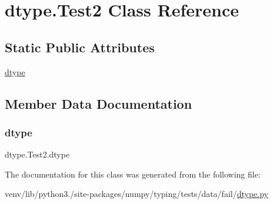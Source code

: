 \hypertarget{classdtype_1_1Test2}{}\section{dtype.\+Test2 Class Reference}
\label{classdtype_1_1Test2}
\subsection*{Static Public Attributes}
\begin{DoxyCompactItemize}
\item 
\hyperlink{classdtype_1_1Test2_a15b6b41108efdc55a68507e2f3ac42a2}{dtype}
\end{DoxyCompactItemize}


\subsection{Member Data Documentation}
\mbox{\label{classdtype_1_1Test2_a15b6b41108efdc55a68507e2f3ac42a2}} 
\subsubsection{\texorpdfstring{dtype}{dtype}}
{\footnotesize\ttfamily dtype.\+Test2.\+dtype\hspace{0.3cm}{\ttfamily [static]}}



The documentation for this class was generated from the following file\+:\begin{DoxyCompactItemize}
\item 
venv/lib/python3./site-\/packages/numpy/typing/tests/data/fail/\hyperlink{fail_2dtype_8py}{dtype.\+py}\end{DoxyCompactItemize}
